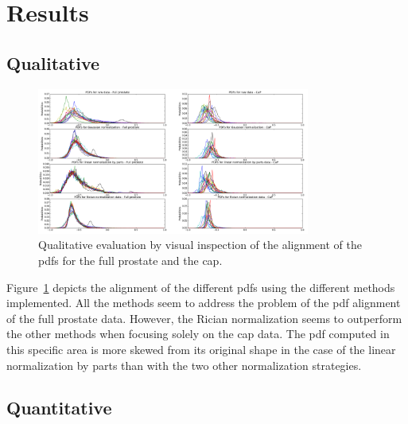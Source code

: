 \graphicspath{ {./content/results/figures/} }

\section{Results}
\label{sec:res}

\subsection{Qualitative}

\begin{figure}
  \centering
  \includegraphics[width=0.8\textwidth]{qualitative.png}
  \caption{Qualitative evaluation by visual inspection of the alignment of the \ac{pdf}s for the full prostate and the \ac{cap}.}
  \label{fig:qu}
\end{figure}

Figure~\ref{fig:qu} depicts the alignment of the different \ac{pdf}s using the different methods implemented. 
All the methods seem to address the problem of the \ac{pdf} alignment of the full prostate data.
However, the Rician normalization seems to outperform the other methods when focusing solely on the \ac{cap} data.
The \ac{pdf} computed in this specific area is more skewed from its original shape in the case of the linear normalization by parts than with the two other normalization strategies.

\subsection{Quantitative}

